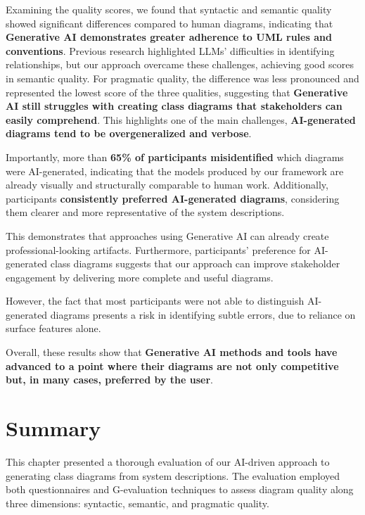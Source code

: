 Examining the quality scores, we found that syntactic and semantic quality 
showed significant differences compared to human diagrams, indicating that 
\textbf{Generative AI demonstrates greater adherence to UML rules and conventions}. 
Previous research highlighted LLMs' difficulties in identifying relationships, but 
our approach overcame these challenges, achieving good scores in semantic 
quality. For pragmatic quality, the difference was less pronounced and 
represented the lowest score of the three qualities, suggesting that \textbf{Generative 
AI still struggles with creating class diagrams that stakeholders can easily 
comprehend}. This highlights one of the main challenges, \textbf{AI-generated 
diagrams tend to be overgeneralized and verbose}.

Importantly, more than \textbf{65\% of participants misidentified} which diagrams were 
AI-generated, indicating that the models produced by our framework are already 
visually and structurally comparable to human work. Additionally, participants 
\textbf{consistently preferred AI-generated diagrams}, considering them clearer and 
more representative of the system descriptions.

This demonstrates that approaches using Generative AI can already create 
professional-looking artifacts. Furthermore, participants' preference for AI-generated 
class diagrams suggests that our approach can improve stakeholder 
engagement by delivering more complete and useful diagrams.

However, the fact that most participants were not able to distinguish AI-generated 
diagrams presents a risk in identifying subtle errors, due to reliance on surface 
features alone.

Overall, these results show that \textbf{Generative AI methods and tools have advanced 
to a point where their diagrams are not only competitive but, in many cases, 
preferred by the user}.
\section{Summary}
This chapter presented a thorough evaluation of our AI-driven approach to 
generating class diagrams from system descriptions. The evaluation employed 
both questionnaires and G-evaluation techniques to assess diagram quality along 
three dimensions: syntactic, semantic, and pragmatic quality.

